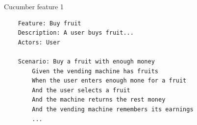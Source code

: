 \begin{listing}[H]
    \centering
    \caption{Cucumber feature 1}\label{lst:feature1}
    \begin{verbatim}
    Feature: Buy fruit
    Description: A user buys fruit...
    Actors: User
    
    Scenario: Buy a fruit with enough money
        Given the vending machine has fruits
        When the user enters enough mone for a fruit
        And the user selects a fruit
        And the machine returns the rest money
        And the vending machine remembers its earnings
        ...
        
    \end{verbatim}
\end{listing}